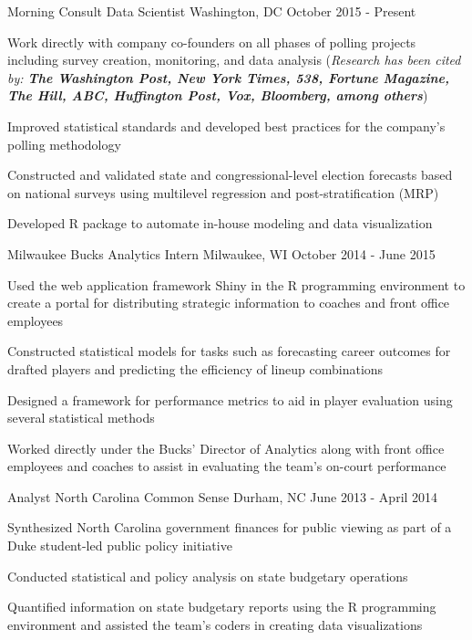 \documentclass[11pt, a4paper]{awesome-cv}
\begin{document}
\begin{cventries}
  \cventry
    {Morning Consult}
    {Data Scientist}
    {Washington, DC}
    {October 2015 - Present}
    {
      \begin{cvitems}
        \item{Work directly with company co-founders on all phases of polling projects including survey creation,
        monitoring, and data analysis (\textit{Research has been cited by: \textbf{The Washington Post, New York Times, 538, Fortune Magazine, The Hill, ABC, Huffington Post, Vox, Bloomberg, among others}})}
        \item{Improved statistical standards and developed best practices for the company’s polling methodology}
        \item{Constructed and validated state and congressional-level election forecasts based on national surveys using multilevel regression and post-stratification (MRP)}
        \item{Developed R package to automate in-house modeling and data visualization}
      \end{cvitems}
    }
  \cventry
    {Milwaukee Bucks}
    {Analytics Intern}
    {Milwaukee, WI}
    {October 2014 - June 2015}
    {
      \begin{cvitems}
        \item{Used the web application framework Shiny in the R programming environment to create a portal for distributing strategic information to coaches and front office employees}
        \item{Constructed statistical models for tasks such as forecasting career outcomes for drafted players
and predicting the efficiency of lineup combinations}
         \item{Designed a framework for performance metrics to aid in player evaluation using several statistical
methods}
        \item{Worked directly under the Bucks’ Director of Analytics along with front office employees and
coaches to assist in evaluating the team’s on-court performance}
      \end{cvitems}
    }
  \cventry
    {Analyst}
    {North Carolina Common Sense}
    {Durham, NC}
    {June 2013 - April 2014}
    {
      \begin{cvitems}
        \item{Synthesized North Carolina government finances for public viewing as part of a Duke student-led
public policy initiative}
        \item{Conducted statistical and policy analysis on state budgetary operations}
        \item{Quantified information on state budgetary reports using the R programming environment and
assisted the team’s coders in creating data visualizations}
      \end{cvitems} 
    }
    

\end{cventries}
\end{document}
